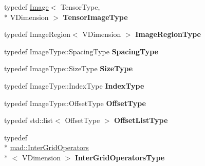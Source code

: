 \begin{DoxyCompactItemize}
\item 
\hypertarget{classitk_1_1mad_1_1_coarse_grid_operators_generator_a6e81aae6a65bc49dd2380d8ae5149449}{typedef \hyperlink{class_image}{Image}$<$ Tensor\-Type, \\*
V\-Dimension $>$ {\bfseries Tensor\-Image\-Type}}\label{classitk_1_1mad_1_1_coarse_grid_operators_generator_a6e81aae6a65bc49dd2380d8ae5149449}

\item 
\hypertarget{classitk_1_1mad_1_1_coarse_grid_operators_generator_a42c6fe4d28725e1af106ec96b9941ed2}{typedef Image\-Region$<$ V\-Dimension $>$ {\bfseries Image\-Region\-Type}}\label{classitk_1_1mad_1_1_coarse_grid_operators_generator_a42c6fe4d28725e1af106ec96b9941ed2}

\item 
\hypertarget{classitk_1_1mad_1_1_coarse_grid_operators_generator_a2c49c95b5f248ecd053025c5cb4ee216}{typedef Image\-Type\-::\-Spacing\-Type {\bfseries Spacing\-Type}}\label{classitk_1_1mad_1_1_coarse_grid_operators_generator_a2c49c95b5f248ecd053025c5cb4ee216}

\item 
\hypertarget{classitk_1_1mad_1_1_coarse_grid_operators_generator_a1b30a1b3daab408a02f1220c742140f2}{typedef Image\-Type\-::\-Size\-Type {\bfseries Size\-Type}}\label{classitk_1_1mad_1_1_coarse_grid_operators_generator_a1b30a1b3daab408a02f1220c742140f2}

\item 
\hypertarget{classitk_1_1mad_1_1_coarse_grid_operators_generator_affa6447b3c7a4a63baee90f747d0d702}{typedef Image\-Type\-::\-Index\-Type {\bfseries Index\-Type}}\label{classitk_1_1mad_1_1_coarse_grid_operators_generator_affa6447b3c7a4a63baee90f747d0d702}

\item 
\hypertarget{classitk_1_1mad_1_1_coarse_grid_operators_generator_aef9d8a64efaca2a001b93067275bbcae}{typedef Image\-Type\-::\-Offset\-Type {\bfseries Offset\-Type}}\label{classitk_1_1mad_1_1_coarse_grid_operators_generator_aef9d8a64efaca2a001b93067275bbcae}

\item 
\hypertarget{classitk_1_1mad_1_1_coarse_grid_operators_generator_a059067a6cd27a563d37030401be27732}{typedef std\-::list$<$ Offset\-Type $>$ {\bfseries Offset\-List\-Type}}\label{classitk_1_1mad_1_1_coarse_grid_operators_generator_a059067a6cd27a563d37030401be27732}

\item 
\hypertarget{classitk_1_1mad_1_1_coarse_grid_operators_generator_a8f7b161091be742fb6981bc7574b6ac9}{typedef \\*
\hyperlink{classitk_1_1mad_1_1_inter_grid_operators}{mad\-::\-Inter\-Grid\-Operators}\\*
$<$ V\-Dimension $>$ {\bfseries Inter\-Grid\-Operators\-Type}}\label{classitk_1_1mad_1_1_coarse_grid_operators_generator_a8f7b161091be742fb6981bc7574b6ac9}


\end{DoxyCompactItemize}
